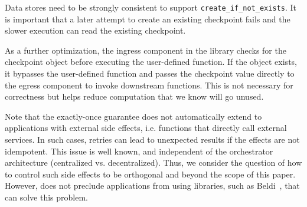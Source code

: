 Data stores need to be strongly consistent to support
\texttt{create\_if\_not\_exists}. It is important that a later attempt to
create an existing checkpoint fails and the slower execution can read the
existing checkpoint.

As a further optimization, the ingress component in the \name{} library checks
for the checkpoint object before executing the user-defined function. If the
object exists, it bypasses the user-defined function and passes the checkpoint
value directly to the egress component to invoke downstream functions. This is
not necessary for correctness but helps reduce computation that we know will
go unused.

Note that the exactly-once guarantee does not automatically extend to
applications with external side effects, i.e. functions that directly call
external services. In such cases, retries can lead to unexpected results if
the effects are not idempotent. This issue is well known, and independent of
the orchestrator architecture (centralized vs. decentralized). Thus, we
consider the question of how to control such side effects to be orthogonal and
beyond the scope of this paper. However, \name{} does not preclude
applications from using libraries, such as Beldi~\cite{beldi}, that can solve
this problem.




